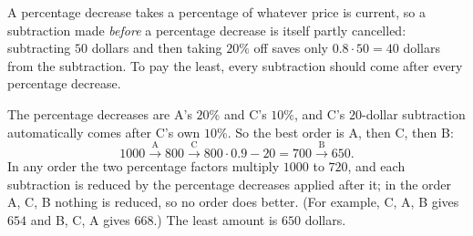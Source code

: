 A percentage decrease takes a percentage of whatever price is current, so a subtraction made \emph{before} a percentage decrease is itself partly cancelled: subtracting $50$ dollars and then taking $20\%$ off saves only $0.8\cdot50=40$ dollars from the subtraction. To pay the least, every subtraction should come after every percentage decrease.

The percentage decreases are A's $20\%$ and C's $10\%$, and C's $20$-dollar subtraction automatically comes after C's own $10\%$. So the best order is A, then C, then B:
\[1000\xrightarrow{\ \text{A}\ }800\xrightarrow{\ \text{C}\ }800\cdot0.9-20=700\xrightarrow{\ \text{B}\ }650 .\]
In any order the two percentage factors multiply $1000$ to $720$, and each subtraction is reduced by the percentage decreases applied after it; in the order A, C, B nothing is reduced, so no order does better. (For example, C, A, B gives $654$ and B, C, A gives $668$.) The least amount is $\boxed{650}$ dollars.
